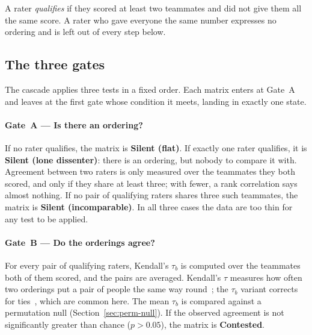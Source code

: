 A rater \emph{qualifies} if they scored at least two teammates and did not give
them all the same score. A rater who gave everyone the same number expresses no
ordering and is left out of every step below.

\subsection{The three gates}
\label{sec:gates}

The cascade applies three tests in a fixed order. Each matrix enters at Gate~A
and leaves at the first gate whose condition it meets, landing in exactly one
state. 

\paragraph{Gate~A --- Is there an ordering?}
If no rater qualifies, the matrix is \textbf{Silent (flat)}. If exactly one
rater qualifies, it is \textbf{Silent (lone dissenter)}: there is an ordering,
but nobody to compare it with. Agreement between two raters is only measured
over the teammates they both scored, and only if they share at least three; with
fewer, a rank correlation says almost nothing. If no pair of qualifying raters
shares three such teammates, the matrix is \textbf{Silent (incomparable)}. In
all three cases the data are too thin for any test to be applied.

\paragraph{Gate~B --- Do the orderings agree?}
For every pair of qualifying raters, Kendall's $\tau_b$ is computed over the
teammates both of them scored, and the pairs are averaged. Kendall's $\tau$
measures how often two orderings put a pair of people the same way
round~\citep{kendall1938tau}; the $\tau_b$ variant corrects for
ties~\citep{kendall1945ties}, which are common here. The mean $\tau_b$ is
compared against a permutation null (Section~\ref{sec:perm-null}). If the
observed agreement is not significantly greater than chance ($p > 0.05$), the
matrix is \textbf{Contested}.

